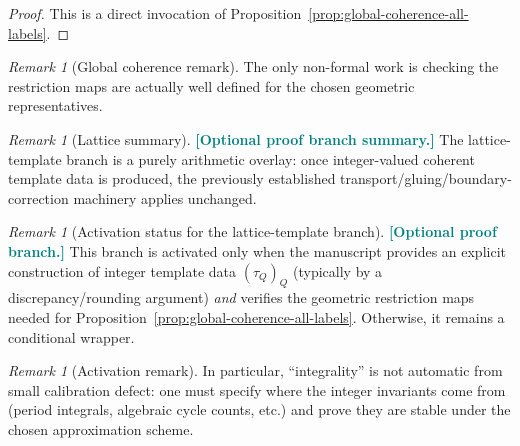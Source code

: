 \documentclass[11pt]{article}
\newcommand{\REVMZ}[1]{\textcolor{teal}{#1}}  %
\numberwithin{equation}{section}  %
\theoremstyle{plain}
\theoremstyle{definition}
\theoremstyle{remark}
\newtheorem{remark}[theorem]{Remark}
\begin{document}
\begin{proof}
This is a direct invocation of Proposition~\ref{prop:global-coherence-all-labels}.
\end{proof}

%
\begin{remark}[Global coherence remark]\label{rem:lattice-global-coherence}
The only non-formal work is checking the restriction maps are actually well defined for the chosen geometric representatives.
\end{remark}


%
\begin{remark}[Lattice summary]\label{rem:lattice-summary}
\REVMZ{\textbf{[Optional proof branch summary.]}}
The lattice-template branch is a purely arithmetic overlay: once integer-valued coherent template data is produced, the previously established
transport/gluing/boundary-correction machinery applies unchanged.
\end{remark}


%
\begin{remark}[Activation status for the lattice-template branch]\label{rem:lattice-activation}
\REVMZ{\textbf{[Optional proof branch.]}}
This branch is activated only when the manuscript provides an explicit construction of integer template data $(\tau_Q)_Q$ (typically by a
discrepancy/rounding argument) \emph{and} verifies the geometric restriction maps needed for
Proposition~\ref{prop:global-coherence-all-labels}.  Otherwise, it remains a conditional wrapper.
\end{remark}


%
\begin{remark}[Activation remark]\label{rem:lattice-activation-remark}
In particular, ``integrality'' is not automatic from small calibration defect: one must specify where the integer invariants come from
(period integrals, algebraic cycle counts, etc.) and prove they are stable under the chosen approximation scheme.
\end{remark}
\end{document}
